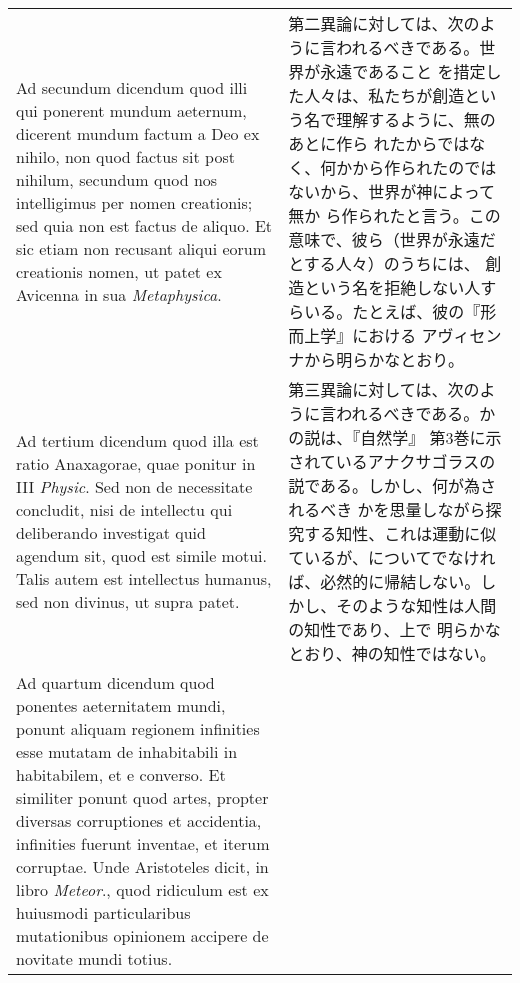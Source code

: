 \documentclass[10pt]{jsarticle} %
\begin{document}
\begin{longtable}{p{21em}p{21em}}
\\


{\sc Ad secundum dicendum} quod illi qui ponerent mundum aeternum, dicerent
 mundum factum a Deo ex nihilo, non quod factus sit post nihilum,
 secundum quod nos intelligimus per nomen creationis; sed quia non est
 factus de aliquo. Et sic etiam non recusant
aliqui eorum creationis
 nomen, ut patet ex Avicenna in sua {\it Metaphysica}.

&


第二異論に対しては、次のように言われるべきである。世界が永遠であること
を措定した人々は、私たちが創造という名で理解するように、無のあとに作ら
れたからではなく、何かから作られたのではないから、世界が神によって無か
ら作られたと言う。この意味で、彼ら（世界が永遠だとする人々）のうちには、
創造という名を拒絶しない人すらいる。たとえば、彼の『形而上学』における
アヴィセンナから明らかなとおり。



\\


{\sc Ad tertium dicendum} quod illa est ratio Anaxagorae, quae ponitur
 in III {\it Physic}. Sed non de necessitate concludit, nisi de intellectu qui
 deliberando investigat quid agendum sit, quod est simile motui. Talis
 autem est intellectus humanus, sed non divinus, ut supra patet.


&

第三異論に対しては、次のように言われるべきである。かの説は、『自然学』
第3巻に示されているアナクサゴラスの説である。しかし、何が為されるべき
かを思量しながら探究する知性、これは運動に似ているが、についてでなけれ
ば、必然的に帰結しない。しかし、そのような知性は人間の知性であり、上で
明らかなとおり、神の知性ではない。


\\


{\sc Ad quartum dicendum} quod ponentes aeternitatem mundi, ponunt
 aliquam regionem infinities esse mutatam de inhabitabili in
 habitabilem, et e converso. Et similiter ponunt quod artes, propter
 diversas corruptiones et accidentia, infinities fuerunt inventae, et
 iterum corruptae. Unde Aristoteles dicit, in libro {\it Meteor}., quod
 ridiculum est ex huiusmodi particularibus mutationibus opinionem
 accipere de novitate mundi totius.


\end{longtable}
\end{document}
